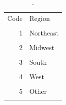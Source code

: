 \begin{table}[htbp]\centering
\caption{.}
\label{tab:region_labels}
\begin{tabular}{rl}\toprule
Code & Region \\\\ \midrule
1 & Northeast \\\\
2 & Midwest \\\\
3 & South \\\\
4 & West \\\\
5 & Other \\\\
\bottomrule\end{tabular}\end{table}
